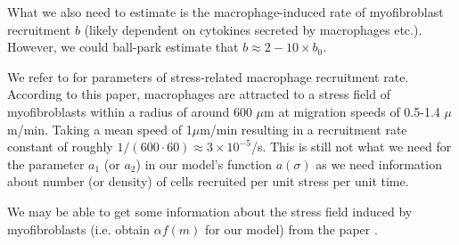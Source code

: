 \documentclass{article}
\begin{document}
What we also need to estimate is the macrophage-induced rate of myofibroblast recruitment $b$ (likely dependent on cytokines secreted by macrophages etc.). However, we could ball-park estimate that $b \approx 2-10 \times b_0$. 

We refer to \cite{pakshir2019dynamic} for parameters of stress-related macrophage recruitment rate. According to this paper, macrophages are attracted to a stress field of myofibroblasts within a radius of around 600 $\mu$m at migration speeds of 0.5-1.4 $\mu$m/min. Taking a mean speed of 1$\mu$m/min resulting in a recruitment rate constant of roughly $1/(600\cdot 60)\approx 3 \times 10^{-5} $/s. This is still not what we need for the parameter $a_1$ (or $a_2$)  in our model's function $a(\sigma)$ as we need information about number (or density) of cells recruited per unit stress per unit time. 

We may be able to get some information about the stress field induced by myofibroblasts (i.e. obtain $\alpha f(m)$ for our model) from the paper \cite{pakshir2019dynamic}.

  
\end{document}
